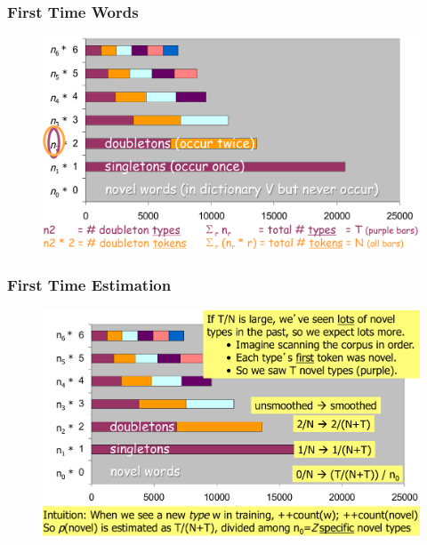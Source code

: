 \documentclass{beamer}
\begin{document}
\begin{frame}\frametitle{First Time Words}
\begin{figure}
\includegraphics[width=1\linewidth]{figure/witten_Bell_words.pdf}
\end{figure}
\end{frame}
\begin{frame}\frametitle{First Time Estimation}
\begin{figure}
\includegraphics[width=1\linewidth]{figure/witten_Bell_smooth.pdf}
\end{figure}
\end{frame}
\end{document}
